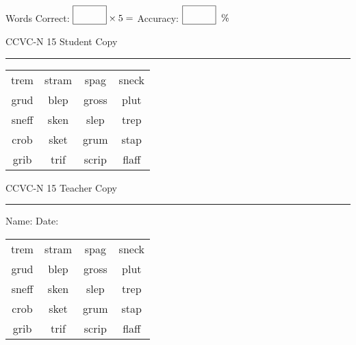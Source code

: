\documentclass{memoir}
\begin{document}
\small

Words Correct: $\fbox{\phantom{\huge 100}} \times 5 = $ Accuracy: $\fbox{\phantom{\huge 100}}\;\; \%$ 

\vfill

\newpage


\footnotesize \noindent
CCVC-N 15 \hfill Student Copy
\smallskip
\hrule

\Large

\setlength{\tabcolsep}{14pt}
\def\arraystretch{3}

{\selectfont


\begin{vplace}[0.5]
\begin{center}
\begin{tabular}{cccc}
trem & stram & spag          & sneck \\
grud & blep & gross                    & plut \\
sneff & sken & slep & trep \\
crob & sket & grum       & stap \\
grib                    & trif & scrip & flaff \\
\end{tabular}
\end{center}
\end{vplace}

}

\newpage

\footnotesize \noindent
CCVC-N 15 \hfill Teacher Copy
\smallskip
\hrule

\small

\vfill

\noindent
Name: \underline{\hspace{1.75in}} \hfill Date: \underline{\hspace{1in}}

\Large

{\selectfont


\begin{vplace}[0.5]
\begin{center}
\begin{tabular}{cccc}
trem & stram & spag          & sneck \\
grud & blep & gross                    & plut \\
sneff & sken & slep & trep \\
crob & sket & grum       & stap \\
grib                    & trif & scrip & flaff \\
\end{tabular}
\end{center}
\end{vplace}



}
\end{document}
